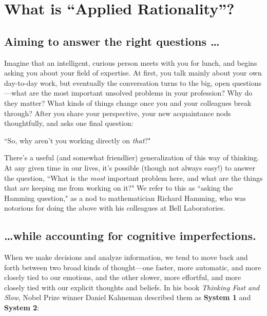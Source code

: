 	\chapter*{What is ``Applied Rationality''?}
	
	\section*{Aiming to answer the right questions \ldots}
	Imagine that an intelligent, curious person meets with you for lunch, and begins asking you about your field of expertise.  At first, you talk mainly about your own day-to-day work, but eventually the conversation turns to the big, open questions---what are the most important unsolved problems in your profession?  Why do they matter?  What kinds of things change once you and your colleagues break through?  After you share your perspective, your new acquaintance nods thoughtfully, and asks one final question:
	
	``So, why aren't you working directly on \emph{that}?"
	
	There's a useful (and somewhat friendlier) generalization of this way of thinking.  At any given time in our lives, it's possible (though not always easy!) to answer the question, ``What is the \emph{most} important problem here, and what are the things that are keeping me from working on it?"  We refer to this as ``asking the Hamming question," as a nod to mathematician Richard Hamming, who was notorious for doing the above with his colleagues at Bell Laboratories.
	\\
	\section*{\ldots while accounting for cognitive imperfections.}
	When we make decisions and analyze information, we tend to move back and forth between two broad kinds of thought---one faster, more automatic, and more closely tied to our emotions, and the other slower, more effortful, and more closely tied with our explicit thoughts and beliefs.  In his book \emph{Thinking Fast and Slow}, Nobel Prize winner Daniel Kahneman described them as \textbf{System 1} and  \textbf{System 2}:
	
